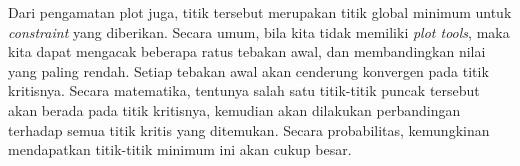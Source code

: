 \documentclass[11pt, a4paper, onecolumn, oneside, final]{report}
\begin{document}
Dari pengamatan plot juga, titik tersebut merupakan titik global minimum untuk \textit{constraint} yang diberikan. Secara umum, bila kita tidak memiliki \textit{plot tools}, maka kita dapat mengacak beberapa ratus tebakan awal, dan membandingkan nilai yang paling rendah. Setiap tebakan awal akan cenderung konvergen pada titik kritisnya. Secara matematika, tentunya salah satu titik-titik puncak tersebut akan berada pada titik kritisnya, kemudian akan dilakukan perbandingan terhadap semua titik kritis yang ditemukan. Secara probabilitas, kemungkinan mendapatkan titik-titik minimum ini akan cukup besar.

\nocite{*}


\end{document}
